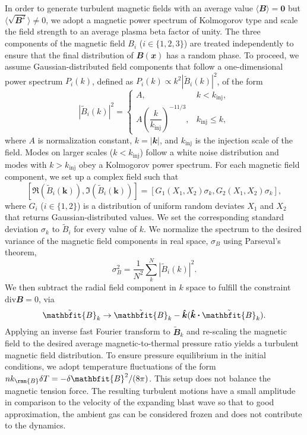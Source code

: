 \documentclass[8pt,a4paper,usenatbib]{mnras}
\newcommand{\bcdot}{\ensuremath{%
  \mathchoice%
   {\mskip\thinmuskip\lower0.2ex\hbox{\scalebox{1.5}{$\cdot$}}\mskip\thinmuskip}}%
   {\mskip\thinmuskip\lower0.2ex\hbox{\scalebox{1.5}{$\cdot$}}\mskip\thinmuskip}%
   {\lower0.3ex\hbox{\scalebox{1.2}{$\cdot$}}}%
   {\lower0.3ex\hbox{\scalebox{1.2}{$\cdot$}}}%
}
\newcommand{\vecbf}{\mathbfit}
\begin{document}
In order to generate turbulent magnetic fields with an average value $\langle
\vecbf{B} \rangle =\mathbf{0}$ but $\langle \sqrt{\vecbf{B}^2}\rangle \neq 0$,
we adopt a magnetic power spectrum of Kolmogorov type and scale the field
strength to an average plasma beta factor of unity.  The three components of the
magnetic field $B_i$ ($i\in\{1,2,3\}$) are treated independently to ensure that
the final distribution of $\vecbf{B}(\vecbf{x})$ has a random phase.  To
proceed, we assume Gaussian-distributed field components that follow a
one-dimensional power spectrum $P_i(k)$, defined as $P_i(k) \propto k^2
|\tilde{B}_i (k)|^2 $, of the form
\begin{equation}
  |\tilde{B}_i (k)|^2 =
  \begin{cases} A, & k < k_{\mathrm{inj}}, \\
    A \left( \dfrac{k}{k_{\mathrm{inj}}}\right)^{-11/3}, & k_{\mathrm{inj}} \leq k,
  \end{cases}
 \end{equation} 
where $A$ is normalization constant, $k = |\vecbf{k}|$, and $k_{\mathrm{inj}}$
is the injection scale of the field. Modes on larger scales
($k<k_{\mathrm{inj}}$) follow a white noise distribution and modes with
$k>k_{\mathrm{inj}}$ obey a Kolmogorov power spectrum.    For
each magnetic field component, we set up a complex field such that
\begin{equation}
\label{reB}
      [\Re(\tilde{B}_i (\bm{k})), \Im(\tilde{B}_i (\bm{k}))]
      = [G_1(X_1, X_2) \sigma_k, G_2(X_1, X_2)  \sigma_k],
\end{equation}
where $G_i$ ($i\in\{1,2\}$) is a distribution of uniform random deviates $X_1$
and $X_2$ that returns Gaussian-distributed values. We set the corresponding
standard deviation $\sigma_k$ to $\tilde{B}_i$ for every value of $k$. We
normalize the spectrum to the desired variance of the magnetic field components
in real space, $\sigma_B$ using Parseval’s theorem,
\begin{equation}
\sigma_B^2 = \dfrac{1}{N^2} \sum_k^N |\tilde{B}_i (k)|^2.
\end{equation}
We then subtract the radial field component in $k$ space to fulfill the
constraint $\mathrm{div}\vecbf{B}=0$, via
\begin{equation}
  \tilde{\vecbf{B}}_k \to
  \tilde{\vecbf{B}}_k - \bm{\hat{k}}  (\bm{\hat{k}} \bcdot \tilde{\vecbf{B}}_k).
\end{equation}
Applying an inverse fast Fourier transform to $\tilde{\vecbf{B}}_k$ and
re-scaling the magnetic field to the desired average magnetic-to-thermal
pressure ratio yields a turbulent magnetic field distribution. To ensure
pressure equilibrium in the initial conditions, we adopt temperature
fluctuations of the form $n k_\rmn{B}\delta T=-\delta \vecbf{B}^2/(8\pi)$. This
setup does not balance the magnetic tension force. The resulting turbulent
motions have a small amplitude in comparison to the velocity of the expanding
blast wave so that to good approximation, the ambient gas can be considered
frozen and does not contribute to the dynamics.
\end{document}

